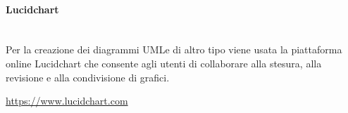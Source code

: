                 \paragraph{Lucidchart}\mbox{}\\ [1mm]
                    Per la creazione dei diagrammi UML\glosp e di altro tipo viene usata la piattaforma online Lucidchart che consente agli utenti di collaborare alla stesura, alla revisione e alla condivisione di grafici. \newline \newline
                    \centerline{\url{https://www.lucidchart.com}}
